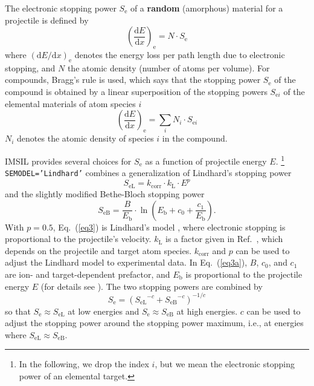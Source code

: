 The electronic stopping power $S_\mathrm{e}$ of a \textbf{random} 
(amorphous) material for a projectile is defined by
%
\begin{equation}
    \left( \frac{\mathrm{d}E}{\mathrm{d}x} \right)_\mathrm{e}
        = N \cdot S_\mathrm{e}
\end{equation}
%
where $(\mathrm{d}E/\mathrm{d}x)_\mathrm{e}$ denotes the energy loss per
path length due to electronic stopping, and $N$ the atomic density (number 
of atoms per volume). 
For compounds, Bragg's rule \cite{w._h._bragg_xxxix._1905} is used, which says
that the stopping power $S_\mathrm{e}$ of the compound is obtained by a linear 
superposition of the stopping powers $S_{\mathrm{e}i}$ of the elemental
materials of atom species $i$
%
\begin{equation}
    \left( \frac{\mathrm{d}E}{\mathrm{d}x} \right)_\mathrm{e}
        = \sum_i N_i \cdot S_{\mathrm{e}i}
\end{equation}
%
$N_i$ denotes the atomic density of species $i$ in the compound. 

IMSIL provides several choices for $S_\mathrm{e}$ as a function of projectile 
energy $E$.%
\footnote{In the following, we drop the index $i$, but we mean the electronic 
stopping power of an elemental target.}
\texttt{SEMODEL='Lindhard'} combines a generalization of Lindhard's
stopping power 
%
\begin{equation}
   S_\mathrm{eL} = k_\mathrm{corr} \cdot k_\mathrm{L} \cdot E^p
   \label{eq3}
\end{equation}
%
and the slightly modified Bethe-Bloch stopping power \cite{I8001}
%
\begin{equation}
   S_\mathrm{eB} = \frac{B}{E_\mathrm{b}} \cdot
      \ln \left( {E_\mathrm{b} + c_0 + \frac{c_1}{E_\mathrm{b}}}\right) .
   \label{eq3a}
\end{equation}
%
With $p = 0.5$, Eq.~(\ref{eq3}) is Lindhard's model \cite{I6101}, where 
electronic stopping is proportional to the projectile's velocity. 
$k_\mathrm{L}$ is a factor given in Ref.~\cite{I6101}, which depends on the 
projectile and target atom species. $k_\mathrm{corr}$ and $p$ can be used to
adjust the Lindhard model to experimental data. In Eq.~(\ref{eq3a}), $B$, 
$c_0$, and $c_1$ are ion- and target-dependent prefactor, and 
$E_\mathrm{b}$ is proportional to the projectile energy $E$ (for details see 
\cite{I8001}). The two stopping powers are combined by 
\cite{I8001,simionescu_model_1995}
%
\begin{equation}
   S_\mathrm{e} = \left( {S_\mathrm{eL}}^{-c} + 
                         {S_\mathrm{eB}}^{-c} \right) ^ {-1/c}
\end{equation}
%
so that $S_\mathrm{e} \approx S_\mathrm{eL}$ at low energies and
$S_\mathrm{e} \approx S_\mathrm{eB}$ at high energies. $c$ can be used to
adjust the stopping power around the stopping power maximum, i.e., at
energies where $S_\mathrm{eL} \approx S_\mathrm{eB}$.

